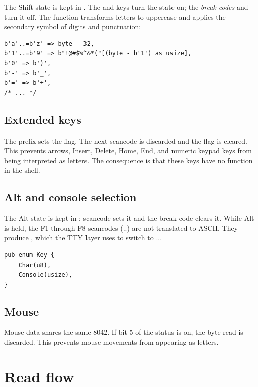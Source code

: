 The Shift state is kept in . The 
and  keys turn the state on; the \emph{break codes}  and
 turn it off. The  function transforms letters to
uppercase and applies the secondary symbol of digits and punctuation:

\begin{lstlisting}[caption={Mapping with Shift.},label={lst:shift}]
b'a'..=b'z' => byte - 32,
b'1'..=b'9' => b"!@#$%^&*("[(byte - b'1') as usize],
b'0' => b')',
b'-' => b'_',
b'=' => b'+',
/* ... */
\end{lstlisting}

\subsection{Extended keys}

The  prefix sets the  flag. The next scancode is
discarded and the flag is cleared. This prevents arrows, Insert, Delete, Home,
End, and numeric keypad keys from being interpreted as letters. The
consequence is that these keys have no function in the shell.

\subsection{Alt and console selection}

The Alt state is kept in : scancode 
sets it and the break code  clears it. While Alt is held, the F1
through F8 scancodes (..) are not translated to ASCII.
They produce , which the TTY layer uses to switch to
...

\begin{lstlisting}[caption={Result of the keyboard driver.},label={lst:key}]
pub enum Key {
    Char(u8),
    Console(usize),
}
\end{lstlisting}

\subsection{Mouse}

Mouse data shares the same 8042. If bit 5 of the status is on, the byte read
is discarded. This prevents mouse movements from appearing as letters.

\section{Read flow}

